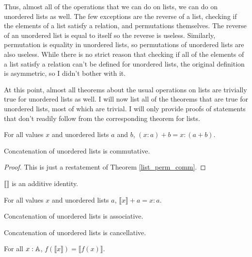 \documentclass[../../math.tex]{subfiles}
\begin{document}
Thus, almost all of the operations that we can do on lists, we can do on
unordered lists as well.  The few exceptions are the reverse of a list, checking
if the elements of a list satisfy a relation, and permutations themselves.  The
reverse of an unordered list is equal to itself so the reverse is useless.
Similarly, permutation is equality in unordered lists, so permutations of
unordered lists are also useless.  While there is no strict reason that checking
if all of the elements of a list satisfy a relation can't be defined for
unordered lists, the original definition is asymmetric, so I didn't bother with
it.

At this point, almost all theorems about the usual operations on lists are
trivially true for unordered lists as well.  I will now list all of the theorems
that are true for unordered lists, most of which are trivial.  I will only
provide proofs of statements that don't readily follow from the corresponding
theorem for lists.

\begin{theorem} \label{ulist_conc_add}
    For all values $x$ and unordered lists $a$ and $b$, $(x : a) + b = x : (a +
    b)$.
\end{theorem}

\begin{instance}
    Concatenation of unordered lists is commutative.
\end{instance}
\begin{proof}
    This is just a restatement of Theorem \ref{list_perm_comm}.
\end{proof}

\begin{instance}
    $\llbracket \rrbracket$ is an additive identity.
\end{instance}

\begin{theorem} \label{ulist_conc_single}
    For all values $x$ and unordered lists $a$, $\llbracket x \rrbracket + a = x
    : a$.
\end{theorem}

\begin{instance}
    Concatenation of unordered lists is associative.
\end{instance}

\begin{instance}
    Concatenation of unordered lists is cancellative.
\end{instance}

\begin{theorem}
    For all $x : \mathbb{A}$, $f(\llbracket x\rrbracket) = \llbracket f(x)\rrbracket$.
\end{theorem}
\end{document}
